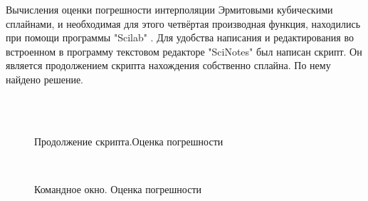 \documentclass[russian,utf8,nocolumnxxxi,nocolumnxxxii]{eskdtext}
\begin{document}
Вычисления оценки погрешности интерполяции Эрмитовыми
кубическими сплайнами, и необходимая для этого четвёртая производная функция, находились при помощи программы "Scilab" . Для удобства написания и редактирования во встроенном в программу текстовом редакторе "SciNotes" был написан скрипт. Он является продолжением скрипта нахождения собственно сплайна.  По нему найдено решение. 
\\ \\
\begin{figure}[H]
 \\
\caption{Продолжение скрипта.Оценка погрешности}
\end{figure}


\begin{figure}[H]
 \\
\caption{Командное окно. Оценка погрешности}
\end{figure}
\end{document}
